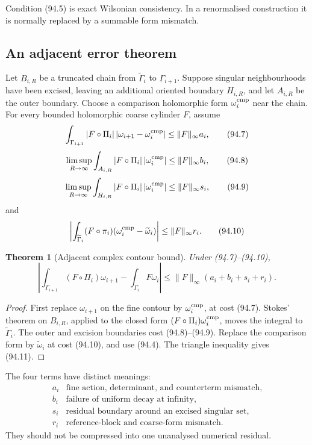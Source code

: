 \documentclass[11pt]{article}
\newtheorem{theorem}{Theorem}[section]
\begin{document}
Condition (94.5) is exact Wilsonian consistency.  In a renormalised
construction it is normally replaced by a summable form mismatch.

\subsection{An adjacent error theorem}

Let \(B_{i,R}\) be a truncated chain from
\(\widetilde\Gamma_i\) to \(\Gamma_{i+1}\).  Suppose singular
neighbourhoods have been excised, leaving an additional oriented
boundary \(H_{i,R}\), and let \(A_{i,R}\) be the outer boundary.
Choose a comparison holomorphic form
\(\omega_i^{\rm cmp}\) near the chain.  For every bounded holomorphic
coarse cylinder \(F\), assume
\[
 \int_{\Gamma_{i+1}}
 |F\circ\Pi_i|\,
 |\omega_{i+1}-\omega_i^{\rm cmp}|
                  \le\|F\|_\infty a_i,                      \tag{94.7}
\]
\[
 \limsup_{R\to\infty}
 \int_{A_{i,R}}|F\circ\Pi_i|\,|\omega_i^{\rm cmp}|
                  \le\|F\|_\infty b_i,                      \tag{94.8}
\]
\[
 \limsup_{R\to\infty}
 \int_{H_{i,R}}|F\circ\Pi_i|\,|\omega_i^{\rm cmp}|
                  \le\|F\|_\infty s_i,                      \tag{94.9}
\]
and
\[
 \left|
 \int_{\widetilde\Gamma_i}(F\circ\pi_i)
       (\omega_i^{\rm cmp}-\widetilde\omega_i)
 \right|
                  \le\|F\|_\infty r_i.                      \tag{94.10}
\]

\begin{theorem}[Adjacent complex contour bound]
\label{thm:v11v94-adjacent}
Under (94.7)--(94.10),
\[
 \left|
 \int_{\Gamma_{i+1}}(F\circ\Pi_i)\omega_{i+1}
 -\int_{\Gamma_i}F\omega_i
 \right|
 \le\|F\|_\infty(a_i+b_i+s_i+r_i).                          \tag{94.11}
\]
\end{theorem}

\begin{proof}
First replace \(\omega_{i+1}\) on the fine contour by
\(\omega_i^{\rm cmp}\), at cost (94.7).  Stokes' theorem on
\(B_{i,R}\), applied to the closed form
\((F\circ\Pi_i)\omega_i^{\rm cmp}\), moves the integral to
\(\widetilde\Gamma_i\).  The outer and excision boundaries cost
(94.8)--(94.9).  Replace the comparison form by
\(\widetilde\omega_i\) at cost (94.10), and use (94.4).
The triangle inequality gives (94.11).
\end{proof}

The four terms have distinct meanings:
\[
 \begin{array}{c|l}
 a_i&\text{fine action, determinant, and counterterm mismatch},\\
 b_i&\text{failure of uniform decay at infinity},\\
 s_i&\text{residual boundary around an excised singular set},\\
 r_i&\text{reference-block and coarse-form mismatch}.
 \end{array}                                                  \tag{94.12}
\]
They should not be compressed into one unanalysed numerical residual.
\end{document}
